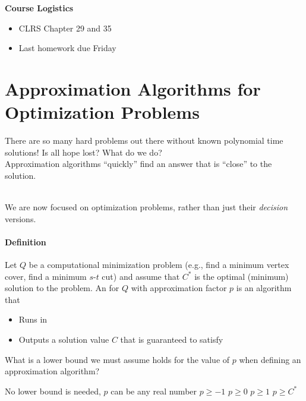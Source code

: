 \documentclass[11  pt]{article}
\begin{document}
	
	\textbf{Course Logistics}
	\begin{itemize}
		\item CLRS Chapter 29 and 35
		\item Last homework due Friday
	\end{itemize}


	
	\section{Approximation Algorithms for Optimization Problems}
	There are so many hard problems out there without known polynomial time solutions! Is all hope lost? What do we do?\\
	
	Approximation algorithms ``quickly'' find an answer that is ``close'' to the solution. \\ \\
	
	\vs{3cm} 
	
	We are now focused on optimization problems, rather than just their \emph{decision} versions.
	\paragraph{Definition}
	Let $Q$ be a computational minimization problem (e.g., find a minimum vertex cover, find a minimum $s$-$t$ cut) and assume that $C^*$ is the optimal (minimum) solution to the problem. An  for $Q$ with approximation factor $p$ is an algorithm that 
	\begin{itemize}
		\item Runs in %
		\item Outputs a solution value $C$ that is guaranteed to satisfy %
	\end{itemize}
	
	\newpage
	
	\begin{Qu}
		What is a lower bound we must assume holds for the value of $p$ when defining an approximation algorithm?
		\begin{itemize}
			\aitem No lower bound is needed, $p$ can be any real number
			\bitem $ p \geq -1$
			\citem $p \geq 0$
			\ditem $p \geq 1$
			\eitem $p \geq C^*$
		\end{itemize}
	\end{Qu}
	\vs{1cm}
	
\end{document}
